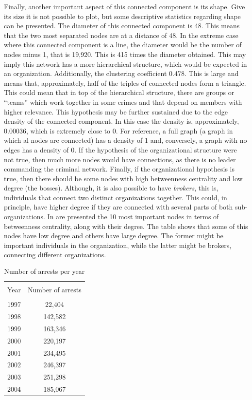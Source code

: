 \documentclass[11pt, english]{article}
\begin{document}
\begin{multicols}{2}
Finally, another important aspect of this connected component is its shape. Give its size it is not possible to plot, but some descriptive statistics regarding shape can be presented. The diameter of this connected component is 48. This means that the two most separated nodes are at a distance of 48. In the extreme case where this connected component is a line, the diameter would be the number of nodes minus 1, that is 19,920. This is 415 times the diameter obtained. This may imply this network has a more hierarchical structure, which would be expected in an organization. Additionally, the clustering coefficient 0.478. This is large and means that, approximately, half of the triples of connected nodes form a triangle. This could mean that in top of the hierarchical structure, there are groups or ``teams'' which work together in some crimes and that depend on members with higher relevance. This hypothesis may be further sustained due to the edge density of the connected component. In this case the density is, approximately, 0.00036, which is extremely close to 0. For reference, a full graph (a graph in which al nodes are connected) has a density of 1 and, conversely, a graph with no edges has a density of 0. If the hypothesis of the organizational structure were not true, then much more nodes would have connections, as there is no leader commanding the criminal network. Finally, if the organizational hypothesis is true, then there should be some nodes with high betweenness centrality and low degree (the bosses). Although, it is also possible to have \textit{brokers}, this is, individuals that connect two distinct organizations together. This could, in principle, have higher degree if they are connected with several parts of both sub-organizations. In  are presented the 10 most important nodes in terms of betweenness centrality, along with their degree. The table shows that some of this nodes have low degree and others have large degree. The former might be important individuals in the organization, while the latter might be brokers, connecting different organizations.

\begin{table}[t]
	\caption{Number of arrests per year}
	\label{tab:crimes-per-year}
	\centering
	\begin{tabular}{cc}
		\hline\hline
		\\[-1.5ex]
		Year	&	Number of arrests	\\[0.5ex]\hline
		\\[-1.5ex]
		1997	&	\hspace{1ex}22,404	\\[0.2ex]
		1998	&	142,582				\\[0.2ex]
		1999	&	163,346				\\[0.2ex]
		2000	&	220,197				\\[0.2ex]
		2001	&	234,495				\\[0.2ex]
		2002	&	246,397				\\[0.2ex]
		2003	&	251,298				\\[0.2ex]
		2004	&	185,067				\\[0.5ex]
		\hline\hline
	\end{tabular}
	


\end{table}
\end{multicols}
\end{document}
